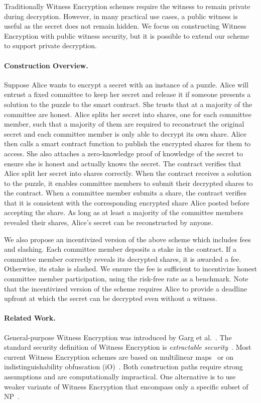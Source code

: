 Traditionally Witness Encryption schemes require the witness to remain private during decryption.
However, in many practical use cases, a public witness is useful as the secret does not remain hidden.
We focus on constructing Witness Encryption with public witness security, but it is possible to extend our scheme to support private decryption.

\paragraph{Construction Overview.}
Suppose Alice wants to encrypt a secret with an instance of a puzzle.
Alice will entrust a fixed committee to keep her secret and release it if someone presents a solution to the puzzle to the smart contract.
She trusts that at a majority of the committee are honest.
Alice splits her secret into shares, one for each committee member, such that a majority of them are required to reconstruct the original secret and each committee member is only able to decrypt its own share.
Alice then calls a smart contract function to publish the encrypted shares for them to access.
She also attaches a zero-knowledge proof of knowledge of the secret to ensure she is honest and actually knows the secret.
The contract verifies that Alice split her secret into shares correctly.
When the contract receives a solution to the puzzle, it enables committee members to submit their decrypted shares to the contract.
When a committee member submits a share, the contract verifies that it is consistent with the corresponding encrypted share Alice posted before accepting the share.
As long as at least a majority of the committee members revealed their shares, Alice's secret can be reconstructed by anyone.

We also propose an incentivized version of the above scheme which includes fees and slashing.
Each committee member deposits a stake in the contract.
If a committee member correctly reveals its decrypted shares, it is awarded a fee.
Otherwise, its stake is slashed.
We ensure the fee is sufficient to incentivize honest committee member participation, using the risk-free rate as a benchmark.
Note that the incentivized version of the scheme requires Alice to provide a deadline upfront at which the secret can be decrypted even without a witness.

\paragraph{Related Work.}
General-purpose Witness Encryption was introduced by Garg et al.~\cite{witness_encryption}.
The standard security definition of Witness Encryption is \emph{extractable security}~\cite{turing_machine_fe}.
Most current Witness Encryption schemes are based on multilinear maps~\cite{witness_encryption,we_multilinear_map} or on indistinguishability obfuscation (iO)~\cite{we_io}. Both construction paths require strong assumptions and are computationally impractical.
One alternative is to use weaker variants of Witness Encryption that encompass only a specific subset of \textsf{NP}~\cite{MrNISC}.

